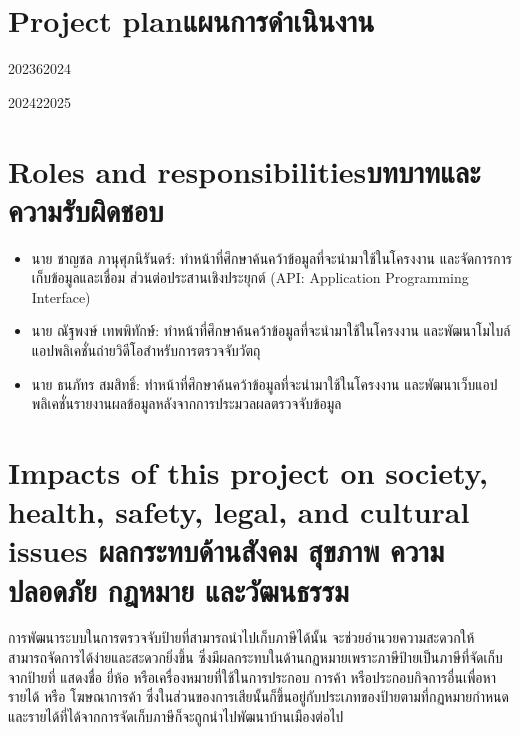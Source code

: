 \section{\ifenglish Project plan\else แผนการดำเนินงาน\fi}

\begin{plan}{10}{2023}{6}{2024}
\end{plan}

\begin{plan}{7}{2024}{2}{2025}
\end{plan}

\section{\ifenglish Roles and responsibilities\else บทบาทและความรับผิดชอบ\fi}
\begin{itemize}
    \item นาย ชาญชล ภานุศุภนิรันดร์: ทำหน้าที่ศึกษาค้นคว้าข้อมูลที่จะนํามาใช้ในโครงงาน และจัดการการเก็บข้อมูลและเชื่อม 
    ส่วนต่อประสานเชิงประยุกต์ (API: Application Programming Interface) 
    \item นาย ณัฐพงษ์ เทพพิทักษ์์: ทําหน้าที่ศึกษาค้นคว้าข้อมูลที่จะนํามาใช้ในโครงงาน และพัฒนาโมไบล์แอปพลิเคชั่นถ่ายวิดีโอสำหรับการตรวจจับวัตถุ 
    \item นาย ธนภัทร สมสิทธิ์: ทําหน้าที่ศึกษาค้นคว้าข้อมูลที่จะนํามาใช้ในโครงงาน และพัฒนาเว็บแอปพลิเคชั่นรายงานผลข้อมูลหลังจากการประมวลผลตรวจจับข้อมูล 
\end{itemize}

\section{\ifenglish%
Impacts of this project on society, health, safety, legal, and cultural issues
\else%
ผลกระทบด้านสังคม สุขภาพ ความปลอดภัย กฎหมาย และวัฒนธรรม
\fi}

การพัฒนาระบบในการตรวจจับป้ายที่สามารถนำไปเก็บภาษีได้นั้น จะช่วยอำนวยความสะดวกให้สามารถจัดการได้ง่ายและสะดวกยิ่งขึ้น 
ซึ่งมีผลกระทบในด้านกฏหมายเพราะภาษีป้ายเป็นภาษีที่จัดเก็บจากป้ายที่ แสดงชื่อ ยี่ห้อ หรือเครื่องหมายที่ใช้ในการประกอบ การค้า หรือประกอบกิจการอื่นเพื่อหารายได้ หรือ 
โฆษณาการค้า ซึ่งในส่วนของการเสียนั้นก็ขึ้นอยู่กับประเภทของป้ายตามที่กฏหมายกำหนด และรายได้ที่ได้จากการจัดเก็บภาษีก็จะถูกนำไปพัฒนาบ้านเมืองต่อไป 
